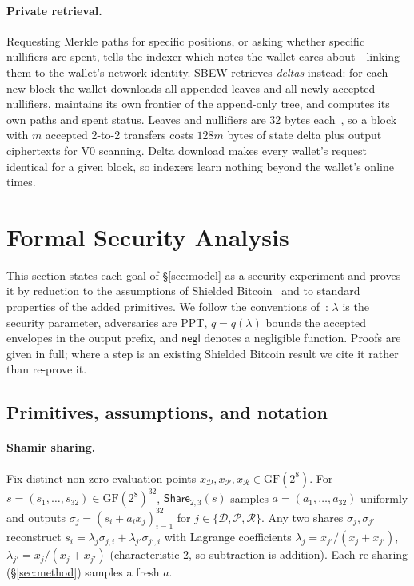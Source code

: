 \documentclass[11pt]{article}
\theoremstyle{remark}
\newcommand{\SB}{Shielded Bitcoin}
\newcommand{\sysname}{\textsf{SBEW}}
\begin{document}
\paragraph{Private retrieval.} Requesting Merkle paths for specific positions, or asking whether specific nullifiers are spent, tells the indexer which notes the wallet cares about---linking them to the wallet's network identity. \sysname{} retrieves \emph{deltas} instead: for each new block the wallet downloads all appended leaves and all newly accepted nullifiers, maintains its own frontier of the append-only tree, and computes its own paths and spent status. Leaves and nullifiers are 32 bytes each~\cite[App.~A.4]{sb26}, so a block with $m$ accepted 2-to-2 transfers costs $128m$ bytes of state delta plus output ciphertexts for V0 scanning. Delta download makes every wallet's request identical for a given block, so indexers learn nothing beyond the wallet's online times.

\section{Formal Security Analysis}
\label{sec:analysis}

This section states each goal of §\ref{sec:model} as a security experiment and proves it by reduction to the assumptions of \SB{}~\cite[§17--19]{sb26} and to standard properties of the added primitives. We follow the conventions of~\cite[§19]{sb26}: $\lambda$ is the security parameter, adversaries are PPT, $q=q(\lambda)$ bounds the accepted envelopes in the output prefix, and $\mathsf{negl}$ denotes a negligible function. Proofs are given in full; where a step is an existing \SB{} result we cite it rather than re-prove it.

\subsection{Primitives, assumptions, and notation}

\paragraph{Shamir sharing.} Fix distinct non-zero evaluation points $x_{\mathcal{D}}, x_{\mathcal{P}}, x_{\mathcal{R}} \in \mathrm{GF}(2^8)$. For $s = (s_1,\dots,s_{32}) \in \mathrm{GF}(2^8)^{32}$, $\mathsf{Share}_{2,3}(s)$ samples $a = (a_1,\dots,a_{32})$ uniformly and outputs $\sigma_j = (s_i + a_i x_j)_{i=1}^{32}$ for $j \in \{\mathcal{D},\mathcal{P},\mathcal{R}\}$. Any two shares $\sigma_j, \sigma_{j'}$ reconstruct $s_i = \lambda_j \sigma_{j,i} + \lambda_{j'} \sigma_{j',i}$ with Lagrange coefficients $\lambda_j = x_{j'}/(x_j + x_{j'})$, $\lambda_{j'} = x_j/(x_j + x_{j'})$ (characteristic 2, so subtraction is addition). Each re-sharing (§\ref{sec:method}) samples a fresh $a$.
\end{document}
